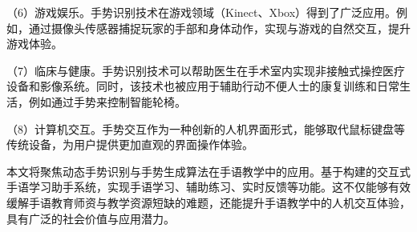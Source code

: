 （6）游戏娱乐。手势识别技术在游戏领域（Kinect、Xbox）得到了广泛应用。例如，通过摄像头传感器捕捉玩家的手部和身体动作，实现与游戏的自然交互，提升游戏体验。

（7）临床与健康。手势识别技术可以帮助医生在手术室内实现非接触式操控医疗设备和影像系统\cite{strickland2013using}。同时，该技术也被应用于辅助行动不便人士的康复训练和日常生活，例如通过手势来控制智能轮椅\cite{zeng2012natural}。

（8）计算机交互。手势交互作为一种创新的人机界面形式，能够取代鼠标键盘等传统设备，为用户提供更加直观的界面操作体验\cite{starner1998real}。

本文将聚焦动态手势识别与手势生成算法在手语教学中的应用。基于构建的交互式手语学习助手系统，实现手语学习、辅助练习、实时反馈等功能。这不仅能够有效缓解手语教育师资与教学资源短缺的难题，还能提升手语教学中的人机交互体验，具有广泛的社会价值与应用潜力。

